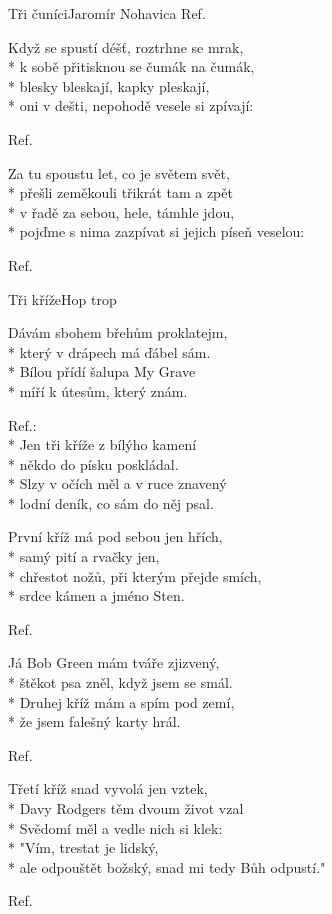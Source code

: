 \documentclass[10.5pt]{book}
\begin{document}
\begin{poem}{Tři čuníci}{Jaromír Nohavica}
Ref.

Když se spustí déšť, roztrhne se mrak,\\*
k sobě přitisknou se čumák na čumák,\\*
blesky bleskají, kapky pleskají,\\*
oni v dešti, nepohodě vesele si zpívají: 

Ref.

Za tu spoustu let, co je světem svět,\\*
přešli zeměkouli třikrát tam a zpět\\*
v řadě za sebou, hele, támhle jdou,\\*
pojďme s nima zazpívat si jejich píseň veselou: 

Ref.

\end{poem}

\begin{poem}{Tři kříže}{Hop trop}

\settowidth{\versewidth}{ale odpouštět božský, snad mi tedy Bůh odpustí."}

Dávám sbohem břehům proklatejm,\\*
který v drápech má ďábel sám.\\*
Bílou přídí šalupa My Grave\\*
míří k útesům, který znám.

Ref.:\\*
Jen tři kříže z bílýho kamení\\*
někdo do písku poskládal.\\*
Slzy v očích měl a v ruce znavený\\*
lodní deník, co sám do něj psal.

První kříž má pod sebou jen hřích,\\*
samý pití a rvačky jen,\\*
chřestot nožů, při kterým přejde smích,\\*
srdce kámen a jméno Sten.

Ref.

Já Bob Green mám tváře zjizvený,\\*
štěkot psa zněl, když jsem se smál.\\*
Druhej kříž mám a spím pod zemí,\\*
že jsem falešný karty hrál.

Ref.

Třetí kříž snad vyvolá jen vztek,\\*
Davy Rodgers těm dvoum život vzal\\*
Svědomí měl a vedle nich si klek:\\*
"Vím, trestat je lidský,\\*
ale odpouštět božský, snad mi tedy Bůh odpustí."

Ref.

\end{poem}
\end{document}
